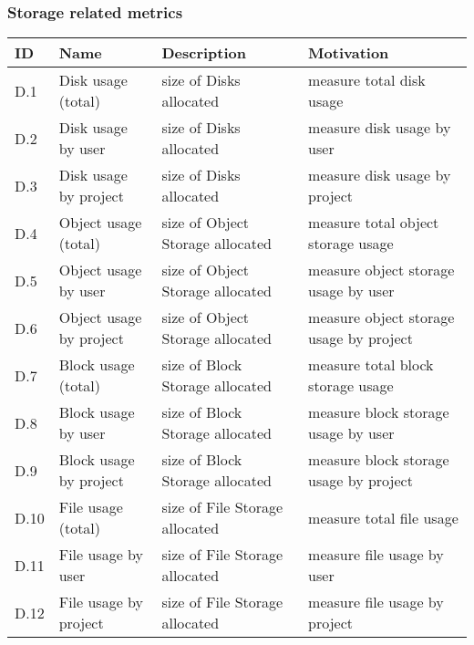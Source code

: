 \documentclass{beamer}
\newcommand{\eTABLE}{\end{tabular}
\end{center}
\end{scriptsize}
}
\newcommand{\bTABLE}[2]{
\frametitle{#1}
\bigskip
\begin{scriptsize}
\begin{center}
\begin{tabular}{lp{0.15\textwidth}p{0.3\textwidth}p{0.4\textwidth}}
\hline
\rowcolor{blue!20} \bf ID & \bf Name & \bf Description & \bf Motivation \\
\hline}
\newenvironment{METRICTABLE}[2] {\bTABLE{#1}{#2}}{\eTABLE}
\begin{document}
\begin{frame}[shrink]
\begin{METRICTABLE}{Storage related metrics}{T:storage}
D.1 & Disk usage (total)        & size of Disks allocated  & measure total disk usage \\ \hline
D.2 & Disk usage by user      & size of Disks allocated  & measure disk usage by user\\ \hline
D.3 & Disk usage by project  & size of Disks allocated  & measure disk usage by project \\ \hline
D.4 & Object usage (total)   & size of Object Storage allocated  & measure total object storage usage \\ \hline
D.5 & Object usage by user   & size of Object Storage allocated  & measure object storage usage by user\\ \hline
D.6 & Object usage by project   & size of Object Storage allocated  & measure object storage usage by project \\ \hline
D.7 & Block usage (total)    & size of Block Storage allocated  & measure total block storage usage \\ \hline
D.8 & Block usage by user   & size of Block Storage allocated  & measure block storage usage by user\\ \hline
D.9 & Block usage by project   & size of Block Storage allocated  & measure block storage usage by project \\ \hline 
D.10 & File usage (total)    & size of File Storage allocated  & measure total file usage \\ \hline
D.11 & File usage by user   & size of File Storage allocated  & measure file usage by user \\ \hline
D.12 & File usage by project   & size of File Storage allocated  & measure file usage by project \\ \hline
\end{METRICTABLE}
\end{frame}
\end{document}
